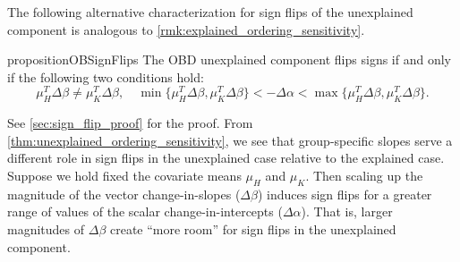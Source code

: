 The following alternative characterization for sign flips of the unexplained component is analogous to \cref{rmk:explained_ordering_sensitivity}.
%
\begin{restatable}{proposition}{OBSignFlips}
    \label{thm:unexplained_ordering_sensitivity}
    The OBD unexplained component flips signs if and only if the following two conditions hold:
    \begin{equation}
    \label{eq:sign_flip_condition}
        \mu_H^T \Delta\beta \neq \mu_K^T \Delta\beta, \quad \min\{\mu_H^T \Delta\beta, \mu_K^T \Delta\beta\} < -\Delta\alpha < \max\{\mu_H^T \Delta\beta, \mu_K^T \Delta\beta\}.
    \end{equation}
\end{restatable}    
See \cref{sec:sign_flip_proof} for the proof.
From \cref{thm:unexplained_ordering_sensitivity}, we see that group-specific slopes serve a different role in sign flips in the unexplained case relative to the explained case.
Suppose we hold fixed the covariate means $\mu_H$ and $\mu_K$. Then scaling up the magnitude of the vector change-in-slopes ($\Delta \beta$) induces sign flips for a greater range of values 
of the scalar change-in-intercepts ($\Delta \alpha$).
That is, larger magnitudes of \( \Delta \beta \) create ``more room'' for sign flips in the unexplained component.

